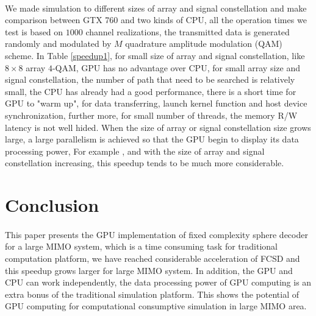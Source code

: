 \documentclass[12pt,a4paper,final]{article}
\begin{document}
\begin{spacing}{2.5}
\paragraph{} We made simulation to different sizes of array and signal constellation and make comparison between GTX 760 and two kinds of CPU, all the operation times we test is based on $1000$ channel realizations, the transmitted data is generated randomly and modulated by $M$ quadrature amplitude modulation (QAM) scheme. In Table \ref{speedup1}, for small size of array and signal constellation, like $8\times 8$ array $4$-QAM, GPU has no advantage over CPU, for small array size and signal constellation, the number of path that need to be searched is relatively small, the CPU has already had a good performance, there is a short time for GPU to "warm up", for data transferring, launch kernel function and host device synchronization, further more, for small number of threads, the memory R/W latency is not well hided. When the size of array or signal constellation size  grows large, a large parallelism is achieved so that the GPU begin to display its data processing power, For example , and with the size of array and signal constellation increasing, this speedup tends to be much more considerable.
\section{Conclusion}\label{conclusion}
\paragraph{}This paper presents the GPU implementation of fixed complexity sphere decoder for a large MIMO system, which is a time consuming task for traditional computation platform, we have reached considerable acceleration of FCSD and this speedup grows larger for large MIMO system. In addition, the GPU and CPU can work independently, the data processing power of GPU computing is an extra bonus of the traditional simulation platform. This shows the potential of GPU computing for computational consumptive simulation in large MIMO area.      











\end{spacing}
\end{document}
